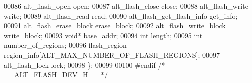 \begin{DoxyCode}
00086   alt_flash_open            open;
00087   alt_flash_close           close;
00088   alt_flash_write           write;
00089   alt_flash_read            read;
00090   alt_flash_get_flash_info  get_info;
00091   alt_flash_erase_block     erase_block;
00092   alt_flash_write_block     write_block;
00093   \textcolor{keywordtype}{void}*                     base_addr;
00094   \textcolor{keywordtype}{int}                       length;
00095   \textcolor{keywordtype}{int}                       number_of_regions;
00096   flash_region              region_info[ALT_MAX_NUMBER_OF_FLASH_REGIONS]; 
00097   alt_flash_lock            lock;
00098 \};
00099 
00100 \textcolor{preprocessor}{#endif }\textcolor{comment}{/* \_\_ALT\_FLASH\_DEV\_H\_\_ */}\textcolor{preprocessor}{}
\end{DoxyCode}
